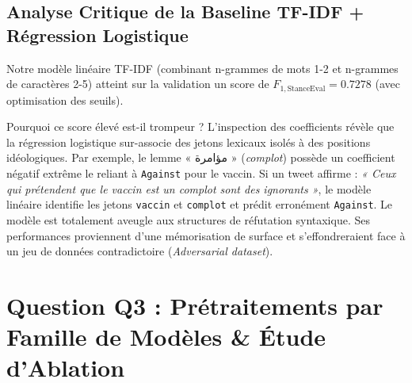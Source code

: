 \documentclass[11pt,a4paper]{article}
\begin{document}
\subsection{Analyse Critique de la Baseline TF-IDF + Régression Logistique}
Notre modèle linéaire TF-IDF (combinant n-grammes de mots 1-2 et n-grammes de caractères 2-5) atteint sur la validation un score de $F_{1,\text{StanceEval}} = \mathbf{0.7278}$ (avec optimisation des seuils).
\begin{infobox}{Pourquoi ce score élevé est-il trompeur ?}
L'inspection des coefficients révèle que la régression logistique sur-associe des jetons lexicaux isolés à des positions idéologiques. Par exemple, le lemme « مؤامرة » (\textit{complot}) possède un coefficient négatif extrême le reliant à \texttt{Against} pour le vaccin. 
Si un tweet affirme : \textit{« Ceux qui prétendent que le vaccin est un complot sont des ignorants »}, le modèle linéaire identifie les jetons \texttt{vaccin} et \texttt{complot} et prédit erronément \texttt{Against}. Le modèle est totalement aveugle aux structures de réfutation syntaxique. Ses performances proviennent d'une mémorisation de surface et s'effondreraient face à un jeu de données contradictoire (\textit{Adversarial dataset}).
\end{infobox}

\section{Question Q3 : Prétraitements par Famille de Modèles \& Étude d'Ablation}
\end{document}
